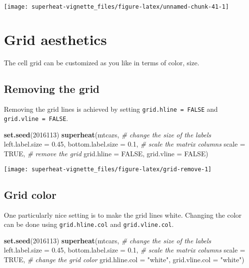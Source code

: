 \documentclass[]{book}
\newenvironment{Shaded}{\begin{snugshade}}{\end{snugshade}}
\newcommand{\KeywordTok}[1]{\textcolor[rgb]{0.13,0.29,0.53}{\textbf{{#1}}}}
\newcommand{\DataTypeTok}[1]{\textcolor[rgb]{0.13,0.29,0.53}{{#1}}}
\newcommand{\DecValTok}[1]{\textcolor[rgb]{0.00,0.00,0.81}{{#1}}}
\newcommand{\FloatTok}[1]{\textcolor[rgb]{0.00,0.00,0.81}{{#1}}}
\newcommand{\StringTok}[1]{\textcolor[rgb]{0.31,0.60,0.02}{{#1}}}
\newcommand{\CommentTok}[1]{\textcolor[rgb]{0.56,0.35,0.01}{\textit{{#1}}}}
\newcommand{\OtherTok}[1]{\textcolor[rgb]{0.56,0.35,0.01}{{#1}}}
\newcommand{\NormalTok}[1]{{#1}}
\theoremstyle{definition}
\theoremstyle{definition}
\theoremstyle{remark}
\begin{document}
\begin{center}\texttt{[image: superheat-vignette\_files/figure-latex/unnamed-chunk-41-1]} \end{center}

\chapter{Grid aesthetics}\label{grid-aesthetics}

The cell grid can be customized as you like in terms of color, size.

\section{Removing the grid}\label{removing-the-grid}

Removing the grid lines is achieved by setting
\texttt{grid.hline\ =\ FALSE} and \texttt{grid.vline\ =\ FALSE}.

\begin{Shaded}
\begin{Highlighting}[]
\KeywordTok{set.seed}\NormalTok{(}\DecValTok{2016113}\NormalTok{)}
\KeywordTok{superheat}\NormalTok{(mtcars,}
          \CommentTok{# change the size of the labels}
          \DataTypeTok{left.label.size =} \FloatTok{0.45}\NormalTok{,}
          \DataTypeTok{bottom.label.size =} \FloatTok{0.1}\NormalTok{,}
          \CommentTok{# scale the matrix columns}
          \DataTypeTok{scale =} \OtherTok{TRUE}\NormalTok{,}
          \CommentTok{# remove the grid}
          \DataTypeTok{grid.hline =} \OtherTok{FALSE}\NormalTok{,}
          \DataTypeTok{grid.vline =} \OtherTok{FALSE}\NormalTok{)}
\end{Highlighting}
\end{Shaded}

\begin{center}\texttt{[image: superheat-vignette\_files/figure-latex/grid-remove-1]} \end{center}

\section{Grid color}\label{grid-color}

One particularly nice setting is to make the grid lines white. Changing
the color can be done using \texttt{grid.hline.col} and
\texttt{grid.vline.col}.

\begin{Shaded}
\begin{Highlighting}[]
\KeywordTok{set.seed}\NormalTok{(}\DecValTok{2016113}\NormalTok{)}
\KeywordTok{superheat}\NormalTok{(mtcars,}
          \CommentTok{# change the size of the labels}
          \DataTypeTok{left.label.size =} \FloatTok{0.45}\NormalTok{,}
          \DataTypeTok{bottom.label.size =} \FloatTok{0.1}\NormalTok{,}
          \CommentTok{# scale the matrix columns}
          \DataTypeTok{scale =} \OtherTok{TRUE}\NormalTok{,}
          \CommentTok{# change the grid color}
          \DataTypeTok{grid.hline.col =} \StringTok{"white"}\NormalTok{,}
          \DataTypeTok{grid.vline.col =} \StringTok{"white"}\NormalTok{)}
\end{Highlighting}
\end{Shaded}
\end{document}
